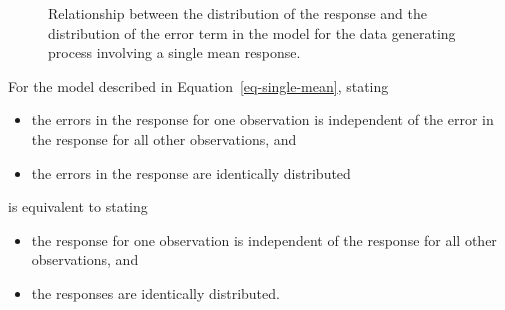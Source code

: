\documentclass[
  letterpaper,
  DIV=11,
  numbers=noendperiod]{scrreprt}
\providecommand{\tightlist}{%
  \setlength{\itemsep}{0pt}\setlength{\parskip}{0pt}}\usepackage{longtable,booktabs,array}
\theoremstyle{definition}
\theoremstyle{definition}
\theoremstyle{plain}
\theoremstyle{remark}
\begin{document}
\begin{figure}


\caption{\label{fig-meanmodels-shift}Relationship between the
distribution of the response and the distribution of the error term in
the model for the data generating process involving a single mean
response.}

\end{figure}%

\begin{tcolorbox}[enhanced jigsaw, colbacktitle=quarto-callout-note-color!10!white, colback=white, left=2mm, title=\textcolor{quarto-callout-note-color}{\faInfo}\hspace{0.5em}{Note}, toptitle=1mm, leftrule=.75mm, breakable, bottomrule=.15mm, arc=.35mm, rightrule=.15mm, toprule=.15mm, coltitle=black, opacityback=0, colframe=quarto-callout-note-color-frame, opacitybacktitle=0.6, bottomtitle=1mm, titlerule=0mm]

For the model described in Equation~\ref{eq-single-mean}, stating

\begin{itemize}
\tightlist
\item
  the errors in the response for one observation is independent of the
  error in the response for all other observations, and
\item
  the errors in the response are identically distributed
\end{itemize}

is equivalent to stating

\begin{itemize}
\tightlist
\item
  the response for one observation is independent of the response for
  all other observations, and
\item
  the responses are identically distributed.
\end{itemize}

\end{tcolorbox}
\end{document}
